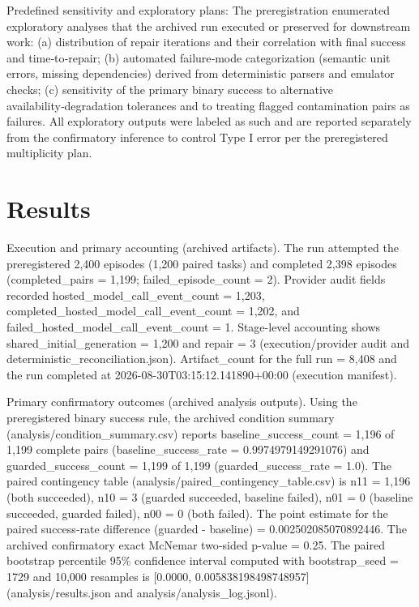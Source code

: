 \documentclass[conference]{IEEEtran}
\begin{document}
Predefined sensitivity and exploratory plans: The preregistration enumerated exploratory analyses that the archived run executed or preserved for downstream work: (a) distribution of repair iterations and their correlation with final success and time‑to‑repair; (b) automated failure‑mode categorization (semantic unit errors, missing dependencies) derived from deterministic parsers and emulator checks; (c) sensitivity of the primary binary success to alternative availability‑degradation tolerances and to treating flagged contamination pairs as failures. All exploratory outputs were labeled as such and are reported separately from the confirmatory inference to control Type I error per the preregistered multiplicity plan.

\section{Results}
Execution and primary accounting (archived artifacts). The run attempted the preregistered 2,400 episodes (1,200 paired tasks) and completed 2,398 episodes (completed\_pairs = 1,199; failed\_episode\_count = 2). Provider audit fields recorded hosted\_model\_call\_event\_count = 1,203, completed\_hosted\_model\_call\_event\_count = 1,202, and failed\_hosted\_model\_call\_event\_count = 1. Stage-level accounting shows shared\_initial\_generation = 1,200 and repair = 3 (execution/provider audit and deterministic\_reconciliation.json). Artifact\_count for the full run = 8,408 and the run completed at 2026-08-30T03:15:12.141890+00:00 (execution manifest).

Primary confirmatory outcomes (archived analysis outputs). Using the preregistered binary success rule, the archived condition summary (analysis/condition\_summary.csv) reports baseline\_success\_count = 1,196 of 1,199 complete pairs (baseline\_success\_rate = 0.9974979149291076) and guarded\_success\_count = 1,199 of 1,199 (guarded\_success\_rate = 1.0). The paired contingency table (analysis/paired\_contingency\_table.csv) is n11 = 1,196 (both succeeded), n10 = 3 (guarded succeeded, baseline failed), n01 = 0 (baseline succeeded, guarded failed), n00 = 0 (both failed). The point estimate for the paired success‑rate difference (guarded - baseline) = 0.002502085070892446. The archived confirmatory exact McNemar two‑sided p-value = 0.25. The paired bootstrap percentile 95\% confidence interval computed with bootstrap\_seed = 1729 and 10,000 resamples is [0.0000, 0.005838198498748957] (analysis/results.json and analysis/analysis\_log.jsonl).
\end{document}
